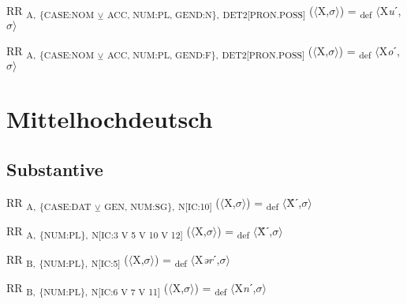 {\begin{exe}
 RR \textsubscript{A,} \textsubscript{\{CASE:NOM} \textsubscript{${\veebar}$}\textsubscript{ ACC, NUM:PL, GEND:N\},} \textsubscript{DET2[PRON.POSS]} ($\langle$X,$\sigma $$\rangle$) = \textsubscript{def} $\langle$X\textit{u}ˊ,$\sigma $$\rangle$
\end{exe}

\begin{exe}
 RR \textsubscript{A,} \textsubscript{\{CASE:NOM} \textsubscript{${\veebar}$}\textsubscript{ ACC, NUM:PL, GEND:F\},} \textsubscript{DET2[PRON.POSS]} ($\langle$X,$\sigma $$\rangle$) = \textsubscript{def} $\langle$X\textit{o}ˊ,$\sigma $$\rangle$
\end{exe}

\section{Mittelhochdeutsch}

\subsection{Substantive}

\begin{exe}
 RR \textsubscript{A,} \textsubscript{\{CASE:DAT} \textsubscript{${\veebar}$}\textsubscript{ GEN, NUM:SG\},} \textsubscript{N[IC:10]} ($\langle$X,$\sigma $$\rangle$) = \textsubscript{def} $\langle$Ẍˊ,$\sigma $$\rangle$
\end{exe}

\begin{exe}
 RR \textsubscript{A,} \textsubscript{\{NUM:PL\},} \textsubscript{N[IC:3 V 5 V 10 V 12]} ($\langle$X,$\sigma $$\rangle$) = \textsubscript{def} $\langle$Ẍˊ,$\sigma $$\rangle$
\end{exe}

\begin{exe}
 RR \textsubscript{B,} \textsubscript{\{NUM:PL\},} \textsubscript{N[IC:5]} ($\langle$X,$\sigma $$\rangle$) = \textsubscript{def} $\langle$X\textit{ər}ˊ,$\sigma $$\rangle$
\end{exe}

\begin{exe}
 RR \textsubscript{B,} \textsubscript{\{NUM:PL\},} \textsubscript{N[IC:6 V 7 V 11]} ($\langle$X,$\sigma $$\rangle$) = \textsubscript{def} $\langle$X\textit{n}ˊ,$\sigma $$\rangle$
\end{exe}

}
